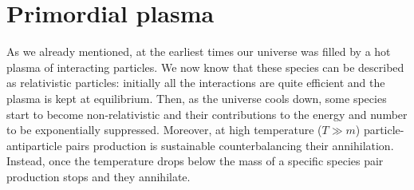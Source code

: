 \section{Primordial plasma}
As we already mentioned, at the earliest times our universe was filled by a hot plasma of interacting particles. We now know that these species can be described as relativistic particles: initially all the interactions are quite efficient and the plasma is kept at equilibrium. Then, as the universe cools down, some species start to become non-relativistic and their contributions to the energy and number to be exponentially suppressed. Moreover, at high temperature ($T\gg m$) particle-antiparticle pairs production is sustainable counterbalancing their annihilation. Instead, once the temperature drops below the mass of a specific species pair production stops and they annihilate.

